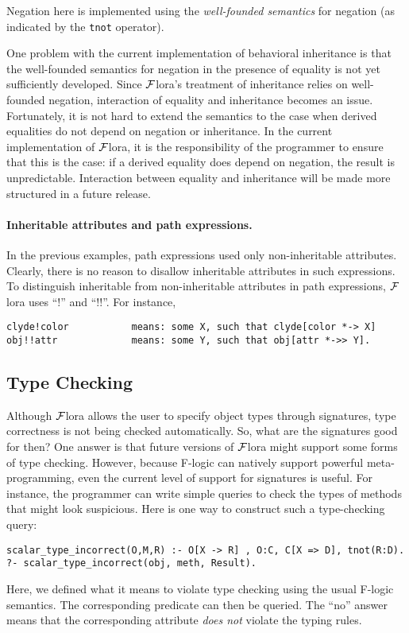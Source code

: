 \documentclass[11pt]{article}
\newcommand{\FLORA}{{\mbox{${\cal F}${\sc lora}}}\xspace}
\begin{document}
Negation here is implemented using the {\em well-founded semantics} for
negation \cite{gelder-alternating-89,gelder-ross-schlipf-91} (as indicated
by the {\tt tnot} operator).

One problem with the current implementation of behavioral inheritance is
that the well-founded semantics for negation in the presence of equality is
not yet sufficiently developed. Since \FLORA's treatment of inheritance
relies on well-founded negation, interaction of equality and inheritance
becomes an issue. Fortunately, it is not hard to extend the semantics to
the case when derived equalities do not depend on negation or inheritance.
In the current implementation of \FLORA, it is the responsibility of the
programmer to ensure that this is the case: if a derived equality does
depend on negation, the result is unpredictable.  Interaction between
equality and inheritance will be made more structured in a future release.

\paragraph{Inheritable attributes and path expressions.}
In the previous examples, path expressions used only non-inheritable
attributes. Clearly, there is no reason to disallow inheritable attributes
in such expressions. To distinguish inheritable from non-inheritable
attributes in path expressions, \FLORA uses ``!'' and ``!!''. For instance, 
\begin{verbatim}
clyde!color           means: some X, such that clyde[color *-> X]
obj!!attr             means: some Y, such that obj[attr *->> Y].
\end{verbatim}

\subsection{Type Checking}

Although \FLORA allows the user to specify object types through signatures,
type correctness is not being checked automatically. So, what are the
signatures good for then? One answer is that future versions of \FLORA
might support some forms of type checking. However, because F-logic can
natively support powerful meta-programming, even the current level
of support for signatures is useful. For instance, the programmer can write
simple queries to check the types of methods that might look suspicious.
Here is one way to construct such a type-checking query:
\begin{verbatim}
scalar_type_incorrect(O,M,R) :- O[X -> R] , O:C, C[X => D], tnot(R:D).
?- scalar_type_incorrect(obj, meth, Result).
\end{verbatim}
Here, we defined what it means to violate type checking using the usual
F-logic semantics. The corresponding predicate can then be queried. The
``no'' answer means that the corresponding attribute \emph{does not}
violate the typing rules.
\end{document}
